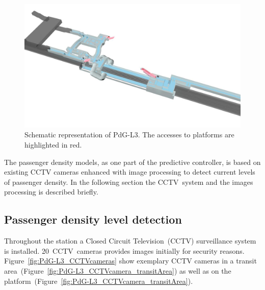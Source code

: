 \begin{figure}[htb]
  \centering
  \includegraphics[width=\linewidth]{Figures/PdG-L3_schematic.jpg} 
  \caption{Schematic representation of PdG-L3. The accesses to platforms are highlighted in red. \cite{TMB}}
  \label{fig:PdG-L3_schematic}
\end{figure}

The passenger density models, as one part of the predictive controller, is based on existing CCTV cameras enhanced with image processing to detect current levels of passenger density. In the following section the CCTV~system and the images processing is described briefly.


\subsection{Passenger density level detection}
\label{subsec:PassengerDensityLevelDetection}

Throughout the station a Closed Circuit Television~(CCTV) surveillance system is installed. 20~CCTV~cameras provides images initially for security reasons. Figure~\ref{fig:PdG-L3_CCTVcameras} show exemplary CCTV cameras in a transit area~(Figure~\ref{fig:PdG-L3_CCTVcamera_transitArea}) as well as on the platform~(Figure~\ref{fig:PdG-L3_CCTVcamera_transitArea}).


